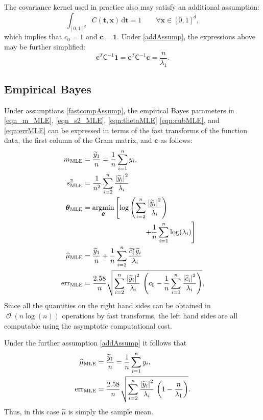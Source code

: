 \documentclass[twocolumn]{svjour3}          %
\DeclareMathOperator{\Order}{{\mathcal O}}
\newcommand{\bm}[1]{\boldsymbol{#1}}
\newcommand{\D}[1]{\text{d}{#1}}
\newcommand{\vtheta}{{\bm{\theta}}}
\newcommand{\vc}{\bm{c}}
\newcommand{\vt}{\bm{t}}
\newcommand{\vx}{\bm{x}}
\newcommand{\vone}{\bm{1}}
\newcommand{\mCInv}{{\mathsf{C}^{-1}}}
\newcommand{\hmu}{\widehat{\mu}}
\newcommand{\MLE}{\textup{MLE}}
\newcommand{\err}{\textup{err}}
\def\abs#1{\ensuremath{\left \lvert #1 \right \rvert}}
\providecommand{\argmin}{\operatorname*{argmin}}
\begin{document}
The covariance kernel used in practice also may satisfy an additional assumption:
\begin{equation} \label{addAssump}
\int_{[0,1]^d} C(\vt,\vx) \, \D \vt = 1 \qquad \forall \vx \in [0,1]^d,
\end{equation}
which implies that $c_0 = 1$ and $\vc = \vone$.  Under \eqref{addAssump}, the expressions above may be further simplified:
\begin{equation*}
\vc^T\mCInv \vone =
\vc^T\mCInv \vc = \frac{n}{\lambda_1}.
\end{equation*}


\subsection{Empirical Bayes}

Under assumptions \eqref{fastcompAssump}, the empirical Bayes parameters in \eqref{eqn_m_MLE}, \eqref{eqn_s2_MLE}, \eqref{eqn:thetaMLE} \eqref{eqn:cubMLE}, and \eqref{eqn:errMLE} can be expressed in terms of the fast transforms of the function data, the first column of the Gram matrix, and $\vc$ as follows:
\begin{align}
\nonumber
m_\MLE &=  \frac{\widetilde{y}_1}{n} = \frac 1n \sum_{i=1}^n y_i,
\\
\nonumber
s^2_\MLE 
& =
\frac{1}{n^2} 
\sum_{i=2}^n \frac{\abs{\widetilde{y}_i}^2}{\lambda_i} \\
\nonumber
\vtheta_\MLE
&= 
\argmin_{\vtheta}
\left[
\log\left(
\sum_{i=2}^n \frac{\abs{\widetilde{y}_i}^2}{\lambda_i}
\right) \right .\\
\label{eqn_MLE_loss_func_optimized_2}
& \hspace{3cm} \left .
  + 
\frac{1}{n}\sum_{i=1}^n \log(\lambda_i)
\right]
\\
\nonumber
\hmu_\MLE  &= 
\frac{\widetilde{y}_1}{n} +
\frac 1n \sum_{i=2}^n \frac{ \widetilde{c}_i^* \widetilde{y}_i}{\lambda_i} \\
\nonumber
\err_\MLE  &
=
\frac{2.58}{n}\sqrt{
	\sum_{i=2}^{n} \frac{\abs{\widetilde{y}_i}^2}{\lambda_i}  
	\,
	\left( c_0 - \frac 1n \sum_{i=1}^n \frac{\abs{\widetilde{c}_i}^2}{\lambda_i} \right) 
},
\end{align}
Since all the quantities on the right hand sides can be obtained in $\Order(n \log(n))$ operations by fast transforms, the left hand sides are all computable using the asymptotic computational cost.

Under the further assumption \eqref{addAssump} it follows that 
\begin{align}
\nonumber
\hmu_\MLE  &= 
\frac{\widetilde{y}_1}{n} = \frac 1n \sum_{i=1}^n y_i,\\
\label{eq:errMLEAllAsump}
\err_\MLE  &
=
\frac{2.58}{n}\sqrt{
	\sum_{i=2}^{n} \frac{\abs{\widetilde{y}_i}^2}{\lambda_i}  
	\,
	\left( 1 -  \frac{n}{\lambda_1} \right) 
}.
\end{align}
Thus, in this  case $\hmu$ is simply the sample mean.
\end{document}
